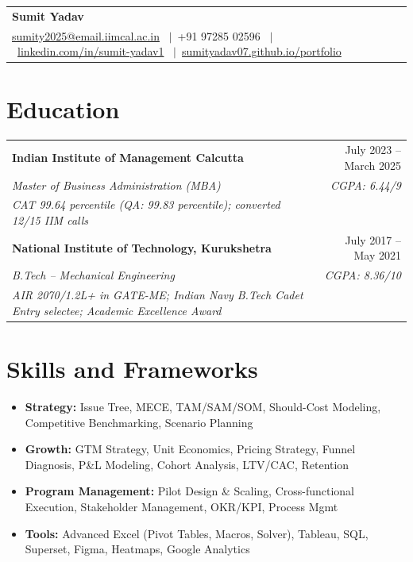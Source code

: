 \documentclass[a4paper,10pt]{article}
\begin{document}
\enlargethispage{32pt}

\vspace*{2pt}
\begin{tabular*}{\textwidth}{l@{\extracolsep{\fill}}r}
  \textbf{\LARGE Sumit Yadav} & \\
  \small\href{mailto:sumity2025@email.iimcal.ac.in}{sumity2025@email.iimcal.ac.in}
  \ $|$\ +91 97285 02596
  \ $|$\ \href{https://www.linkedin.com/in/sumit-yadav1}{linkedin.com/in/sumit-yadav1}
  \ $|$\ \href{https://sumityadav07.github.io/portfolio/}{sumityadav07.github.io/portfolio} & \\
\end{tabular*}
\vspace{-2pt}

\section{Education}
\vspace{0pt}
\begin{tabular*}{\textwidth}{l@{\extracolsep{\fill}}r}
  \textbf{\small Indian Institute of Management Calcutta} & \small July 2023 -- March 2025 \\
  \textit{\small Master of Business Administration (MBA)} & \textit{\small CGPA: 6.44/9} \\
  \textit{\small CAT 99.64 percentile (QA: 99.83 percentile); converted 12/15 IIM calls} & \\[2pt]
  \textbf{\small National Institute of Technology, Kurukshetra} & \small July 2017 -- May 2021 \\
  \textit{\small B.Tech -- Mechanical Engineering} & \textit{\small CGPA: 8.36/10} \\
  \textit{\small AIR 2070/1.2L+ in GATE-ME; Indian Navy B.Tech Cadet Entry selectee; Academic Excellence Award} & \\
\end{tabular*}
\vspace{0pt}

\section{Skills and Frameworks}
\vspace{0pt}
\begin{itemize}[leftmargin=0in, label={}, itemsep=0pt, topsep=0pt]
  \item \small\textbf{Strategy:} Issue Tree, MECE, TAM/SAM/SOM, Should-Cost Modeling, Competitive Benchmarking, Scenario Planning
  \item \small\textbf{Growth:} GTM Strategy, Unit Economics, Pricing Strategy, Funnel Diagnosis, P\&L Modeling, Cohort Analysis, LTV/CAC, Retention
  \item \small\textbf{Program Management:} Pilot Design \& Scaling, Cross-functional Execution, Stakeholder Management, OKR/KPI, Process Mgmt
  \item \small\textbf{Tools:} Advanced Excel (Pivot Tables, Macros, Solver), Tableau, SQL, Superset, Figma, Heatmaps, Google Analytics
\end{itemize}
\vspace{0pt}
\end{document}

